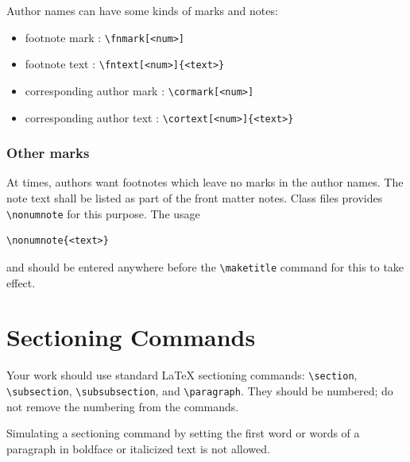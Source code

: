 \documentclass[
]{ceurart}
\begin{document}
Author names can have some kinds of marks and notes:
\begin{itemize}
\item footnote mark : \verb|\fnmark[<num>]|
\item footnote text : \verb|\fntext[<num>]{<text>}|
\item corresponding author mark : \verb|\cormark[<num>]|
\item corresponding author text : \verb|\cortext[<num>]{<text>}|
\end{itemize}

\subsubsection{Other marks}

At times, authors want footnotes which leave no marks in
the author names. The note text shall be listed as part of
the front matter notes. Class files provides
\verb|\nonumnote| for this purpose. The usage
\begin{lstlisting}
\nonumnote{<text>}
\end{lstlisting}
and should be entered anywhere before the \verb|\maketitle|
command for this to take effect. 

\section{Sectioning Commands}

Your work should use standard \LaTeX{} sectioning commands:
\verb|\section|, \verb|\subsection|,
\verb|\subsubsection|, and
\verb|\paragraph|. They should be numbered; do not remove
the numbering from the commands.

Simulating a sectioning command by setting the first word or words of
a paragraph in boldface or italicized text is not allowed.
\end{document}

